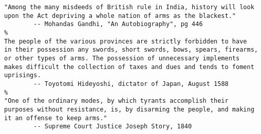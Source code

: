 \documentclass[11pt,oneside]{book}
\begin{document}
\begin{common-format}
\begin{Verbatim}
"Among the many misdeeds of British rule in India, history will look
upon the Act depriving a whole nation of arms as the blackest."
        -- Mohandas Gandhi, "An Autobiography", pg 446
%
The people of the various provinces are strictly forbidden to have 
in their possession any swords, short swords, bows, spears, firearms,
or other types of arms. The possession of unnecessary implements 
makes difficult the collection of taxes and dues and tends to foment 
uprisings.
        -- Toyotomi Hideyoshi, dictator of Japan, August 1588
%
"One of the ordinary modes, by which tyrants accomplish their 
purposes without resistance, is, by disarming the people, and making 
it an offense to keep arms."
        -- Supreme Court Justice Joseph Story, 1840
\end{Verbatim}


\end{common-format}  
\end{document}
